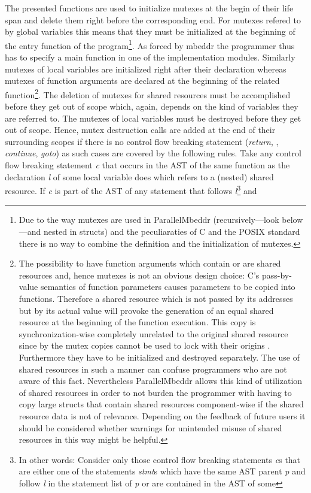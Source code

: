 The presented functions are used to initialize mutexes at the begin of their life span and delete them right before the corresponding end. For mutexes refered to by global variables this means that they must be initialized at the beginning of the entry function of the program\footnote{Due to the way mutexes are used in ParallelMbeddr (recursively---look below---and nested in structs) and the peculiaraties of C and the POSIX standard there is no way to combine the definition and the initialization of mutexes.}. As forced by mbeddr the programmer thus has to specify a main function in one of the implementation modules. Similarly mutexes of local variables are initialized right after their declaration whereas mutexes of function arguments are declared at the beginning of the related function\footnote{\label{mutexCopies}The possibility to have function arguments which contain or are shared resources and, hence mutexes is not an obvious design choice: C's pass-by-value semantics of function parameters causes parameters to be copied into functions. Therefore a shared resource which is not passed by its addresses but by its actual value will provoke the generation of an equal shared resource at the beginning of the function execution. This copy is synchronization-wise completely unrelated to the original shared resource since by the mutex copies cannot be used to lock with their origins \cite{Mutexes}. Furthermore they have to be initialized and destroyed separately. The use of shared resources in such a manner can confuse programmers who are not aware of this fact. Nevertheless ParallelMbeddr allows this kind of utilization of shared resources in order to not burden the programmer with having to copy large structs that contain shared resources component-wise if the shared resource data is not of relevance. Depending on the feedback of future users it should be considered whether warnings for unintended misuse of shared resources in this way might be helpful.}. The deletion of mutexes for shared resources must be accomplished before they get out of scope which, again, depends on the kind of variables they are referred to. 
The mutexes of local variables must be destroyed before they get out of scope. Hence, mutex destruction calls are added at the end of their surrounding scopes if there is no control flow breaking statement (\textit{return}, , \textit{continue}, \textit{goto}) as such cases are covered by the following rules. Take any control flow breaking statement \textit{c} that occurs in the AST of the same function as the declaration \textit{l} of some local variable does which refers to a (nested) shared resource. If \textit{c} is part of the AST of any statement that follows \textit{l}\footnote{In other words: Consider only those control flow breaking statements \textit{c}s that are either one of the statements \textit{stmt}s which have the same AST parent \textit{p} and follow \textit{l} in the statement list of \textit{p} or are contained in the AST of some } and
